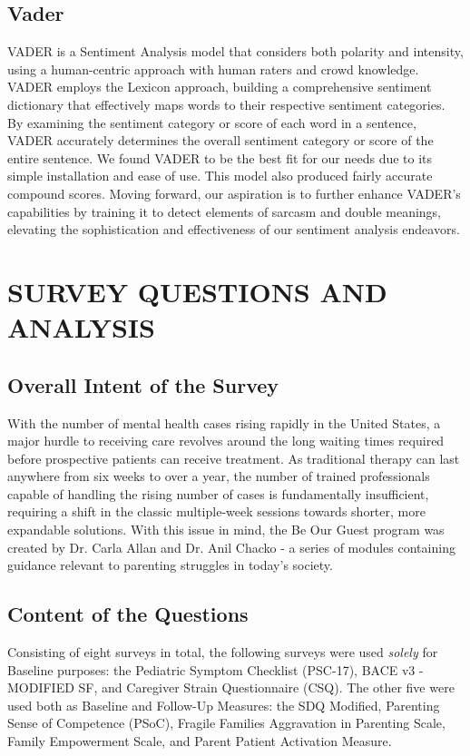 \documentclass[letterpaper, 12 pt, conference]{ieeeconf}
\begin{document}
\subsection{Vader}
VADER is a Sentiment Analysis model that considers both polarity and intensity, using a human-centric approach with human raters and crowd knowledge. VADER employs the Lexicon approach, building a comprehensive sentiment dictionary that effectively maps words to their respective sentiment categories. By examining the sentiment category or score of each word in a sentence, VADER accurately determines the overall sentiment category or score of the entire sentence. We found VADER to be the best fit for our needs due to its simple installation and ease of use. This model also produced fairly accurate compound scores. Moving forward, our aspiration is to further enhance VADER's capabilities by training it to detect elements of sarcasm and double meanings, elevating the sophistication and effectiveness of our sentiment analysis endeavors.


\section{SURVEY QUESTIONS AND ANALYSIS}

\subsection{Overall Intent of the Survey}
With the number of mental health cases rising rapidly in the United States, a major hurdle to receiving care revolves around the long waiting times required before prospective patients can receive treatment. As traditional therapy can last anywhere from six weeks to over a year, the number of trained professionals capable of handling the rising number of cases is fundamentally insufficient, requiring a shift in the classic multiple-week sessions towards shorter, more expandable solutions. With this issue in mind, the Be Our Guest program was created by Dr. Carla Allan and Dr. Anil Chacko - a series of modules containing guidance relevant to parenting struggles in today's society. 


\subsection{Content of the Questions}
Consisting of eight surveys in total, the following surveys were used \textit{solely} for Baseline purposes: the Pediatric Symptom Checklist (PSC-17), BACE v3 - MODIFIED SF, and Caregiver Strain Questionnaire (CSQ). The other five were used both as Baseline and Follow-Up Measures: the SDQ Modified, Parenting Sense of Competence (PSoC), Fragile Families Aggravation in Parenting Scale, Family Empowerment Scale, and Parent Patient Activation Measure. 
\end{document}
